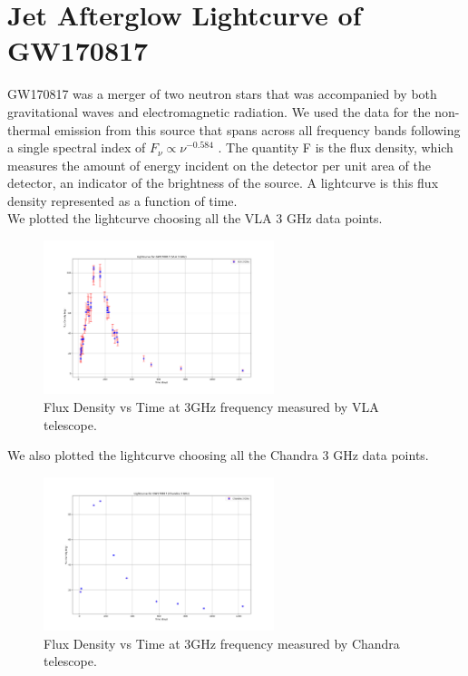 \clearpage

\section{Jet Afterglow Lightcurve of GW170817}

GW170817\cite{gw170817_afterglow} was a merger of two neutron stars that was accompanied by both gravitational waves and electromagnetic radiation. We used the data for the non-thermal emission from this source that spans across all frequency bands following a single spectral index of $F_{\nu} \propto {\nu}^{-0.584}$ . The quantity F is the flux density, which measures the amount of energy incident on the detector per unit area of the detector, an indicator of the brightness of the source. A lightcurve is this flux density represented as a function of time. \\

We plotted the lightcurve choosing all the VLA 3 GHz data points.

\begin{figure}[H]
    \centering
    \includegraphics[width=0.6\textwidth]{Images/vla_lightcurve.png}
    \caption{Flux Density vs Time at 3GHz frequency measured by VLA telescope.}
    \label{fig:vla_lightcurve}
\end{figure}

\vspace{10mm}

We also plotted the lightcurve choosing all the Chandra 3 GHz data points.

\begin{figure}[H]
    \centering
    \includegraphics[width=0.6\textwidth]{Images/chandra_lightcurve.png}
    \caption{Flux Density vs Time at 3GHz frequency measured by Chandra telescope.}
    \label{fig:chandra_lightcurve}
\end{figure}

